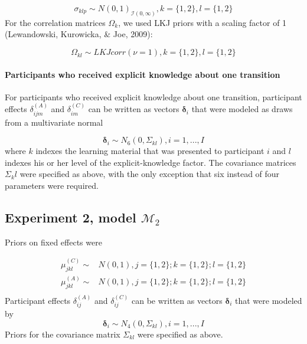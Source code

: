 \documentclass[english,,man]{apa6}
\begin{document}
\begin{appendix}
\[
\sigma_{klp} \sim N (0, 1)_{\mathcal{I}(0, \infty)}, k = \lbrace 1, 2 \rbrace, l = \lbrace 1, 2 \rbrace
\] For the correlation matrices \(\Omega_{k}\), we used LKJ priors with
a scaling factor of 1 (Lewandowski, Kurowicka, \& Joe, 2009):

\[
\Omega_{kl} \sim \textit{LKJcorr}(\nu = 1), k = \lbrace 1, 2 \rbrace, l = \lbrace 1, 2 \rbrace
\]

\hypertarget{participants-who-received-explicit-knowledge-about-one-transition}{%
\paragraph{Participants who received explicit knowledge about one
transition}\label{participants-who-received-explicit-knowledge-about-one-transition}}

For participants who received explicit knowledge about one transition,
participant effects \(\delta_{ijm}^{(A)}\) and \(\delta_{im}^{(C)}\) can
be written as vectors \(\boldsymbol{\delta}_i\) that were modeled as
draws from a multivariate normal

\[
\boldsymbol{\delta}_i \sim N_6 (0, \Sigma_{kl}), i = 1, ..., I
\] where \(k\) indexes the learning material that was presented to
participant \(i\) and \(l\) indexes his or her level of the
explicit-knowledge factor. The covariance matrices \(\Sigma_kl\) were
specified as above, with the only exception that six instead of four
parameters were required.

\hypertarget{experiment-2-model-mathcalm_2}{%
\subsection{\texorpdfstring{Experiment 2, model
\(\mathcal{M}_2\)}{Experiment 2, model \textbackslash{}mathcal\{M\}\_2}}\label{experiment-2-model-mathcalm_2}}

Priors on fixed effects were

\[
\begin{aligned}
\mu_{jkl}^{(C)} \sim & N(0, 1), j = \lbrace 1, 2 \rbrace; k = \lbrace 1, 2 \rbrace; l = \lbrace 1, 2 \rbrace\\
\mu_{jkl}^{(A)} \sim & N(0, 1), j = \lbrace 1, 2 \rbrace; k = \lbrace 1, 2 \rbrace; l = \lbrace 1, 2 \rbrace\\
\end{aligned}
\] Participant effects \(\delta_{ij}^{(A)}\) and \(\delta_{ij}^{(C)}\)
can be written as vectors \(\boldsymbol{\delta}_i\) that were modeled by
\[
\boldsymbol{\delta}_i \sim N_4 (0, \Sigma_{kl}), i = 1, ..., I
\] Priors for the covariance matrix \(\Sigma_{kl}\) were specified as
above.


\end{appendix}
\end{document}
